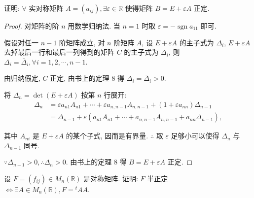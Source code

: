 \documentclass[color=black,device=normal,lang=cn,mode=geye]{elegantnote}
\begin{document}
\begin{exercise}%
    证明: $\forall$ 实对称矩阵 $A=(a_{ij}),\exists\varepsilon\in\mathbb{R}$ 使得矩阵 $B=E+\varepsilon A$ 正定.
\end{exercise}
\begin{proof}
    对矩阵的阶 $n$ 用数学归纳法. 当 $n=1$ 时取 $\varepsilon=-\operatorname{sgn}a_{11}$ 即可.

    假设对任一 $n-1$ 阶矩阵成立, 对 $n$ 阶矩阵 $A$, 设 $E+\varepsilon A$ 的主子式为 $\Delta_i$, $E+\varepsilon A$ 去掉最后一行和最后一列得到的矩阵 $C$ 的主子式为 $\overline{\Delta}_i$, 则 $\Delta_i=\overline{\Delta}_i,\forall i=1,2,\cdots,n-1$.

    由归纳假定, $C$ 正定, 由书上的定理 8 得 $\Delta_i=\overline{\Delta}_i>0$.
    
    将 $\Delta_n=\det(E+\varepsilon A)$ 按第 $n$ 行展开:
    \begin{align*}
        \Delta_n & =\varepsilon a_{n1}A_{n1}+\cdots+\varepsilon a_{n,n-1}A_{n,n-1}+(1+\varepsilon a_{nn})\Delta_{n-1} \\
        & =\Delta_{n-1}+\varepsilon(a_{n1}A_{n1}+\cdots+a_{n,n-1}A_{n,n-1}+a_{nn}\Delta_{n-1}),
    \end{align*}

    其中 $A_{ni}$ 是 $E+\varepsilon A$ 的某个子式, 因而是有界量. $\therefore$ 取 $\varepsilon$ 足够小可以使得 $\Delta_n$ 与 $\Delta_{n-1}$ 同号.
    
    $\because\Delta_{n-1}>0,\therefore\Delta_n>0$. 由书上的定理 8 得 $B=E+\varepsilon A$ 正定.
\end{proof}
\begin{exercisec}\label{exc6}
    设 $F=(f_{ij})\in M_n(\mathbb{R})$ 是对称矩阵. 证明: $F$ 半正定 $\Leftrightarrow\exists A\in M_n(\mathbb{R}),F={}^tAA$.
\end{exercisec}
\end{document}
